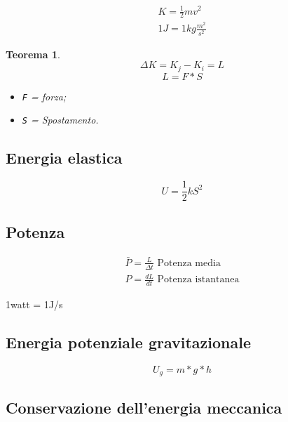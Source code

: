 \documentclass{article}
\newtheorem{teo}{Teorema}
\begin{document}
\begin{eqnarray}
  \label{eq:energiacinetica}
  K=\frac{1}{2}mv^2\\
  1J= 1kg \frac{m^2}{s^2}
\end{eqnarray}
\begin{teo}
  \begin{equation}
    \label{eq:teoen}
    \Delta{}K= K_j-K_i=L
  \end{equation}
  \begin{equation}
    \label{eq:lavoro}
    L=F*S
  \end{equation}
  \begin{itemize}
  \item \texttt{F} = forza;
  \item \texttt{S} = Spostamento.
  \end{itemize}
\end{teo}

\subsection{Energia elastica}
\label{sec:enelastica}

\begin{equation}
  \label{eq:enelast}
  U=\frac{1}{2}kS^2
\end{equation}

\subsection{Potenza}
\label{sec:potenza}

\begin{eqnarray*}
  \bar{P}=\frac{L}{\Delta{}t} \text{ Potenza media}\\
  P=\frac{dL}{dt} \text{ Potenza istantanea}
\end{eqnarray*}
\begin{center}
  1watt = 1J/s
\end{center}

\subsection{Energia potenziale gravitazionale}
\label{sec:enpotgrav}
\begin{equation}
  \label{eq:enpotgrav}
  U_g=m*g*h
\end{equation}

\subsection{Conservazione dell'energia meccanica}
\label{sec:condelmecc}
\end{document}

